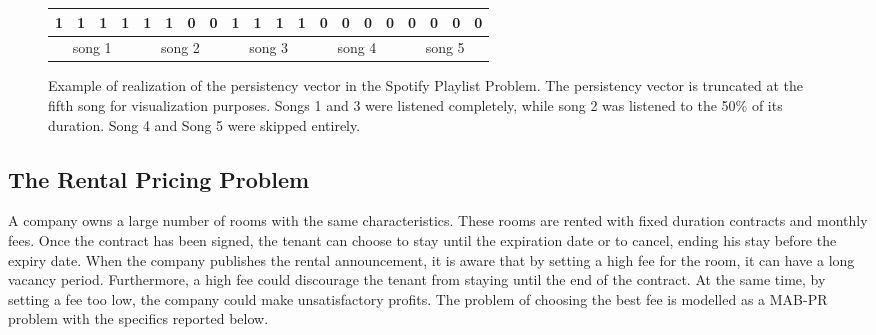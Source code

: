 \begin{figure}[h]
	
	\centering
		\begin{tabular}{cccccccccccccccccccc}
			\hline
			\multicolumn{1}{|c}{1} & 1 & 1 & \multicolumn{1}{c|}{1} & 1 & 1 & 0 & \multicolumn{1}{c|}{0} & 1 & 1 & 1 & \multicolumn{1}{c|}{1} & 0 & 0 & 0 & \multicolumn{1}{c|}{0} & 0 & 0 & 0 & \multicolumn{1}{c|}{0} \\ \hline
			\multicolumn{4}{c}{song 1}                              & \multicolumn{4}{c}{song 2}         & \multicolumn{4}{c}{song 3}         & \multicolumn{4}{c}{song 4}         & \multicolumn{4}{c}{song 5}        
		\end{tabular}



\caption{Example of realization of the persistency vector in the Spotify Playlist Problem. The persistency vector is truncated at the fifth song for visualization purposes. Songs 1 and 3 were listened completely, while song 2 was listened to the 50\% of its duration. Song 4 and Song 5 were skipped entirely.}
\label{bucket_spotify}
\end{figure}






\subsection{The Rental Pricing Problem}
A company owns a large number of rooms with the same characteristics. These rooms are rented with fixed duration contracts and monthly fees. Once the contract has been signed, the tenant can choose to stay until the expiration date or to cancel, ending his stay before the expiry date. When the company publishes the rental announcement, it is aware that by setting a high fee for the room, it can have a long vacancy period. Furthermore, a high fee could discourage the tenant from staying until the end of the contract. At the same time, by setting a fee too low, the company could make unsatisfactory profits. The problem of choosing the best fee is modelled as a MAB-PR problem with the specifics reported below.

